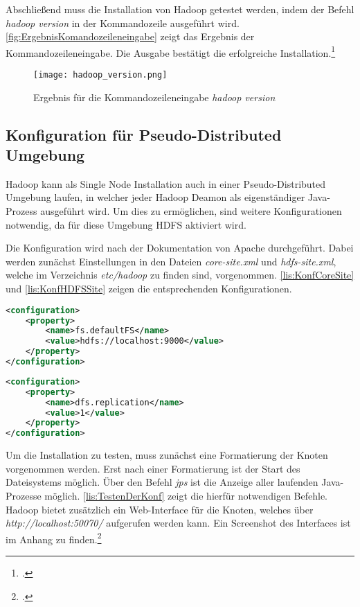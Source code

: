 Abschließend muss die Installation von Hadoop getestet werden, indem der Befehl \textit{hadoop version} in der Kommandozeile ausgeführt wird. \autoref{fig:ErgebnisKomandozeileneingabe} zeigt das Ergebnis der Kommandozeileneingabe. Die Ausgabe bestätigt die erfolgreiche Installation.\footcite[Vgl.][S. 32 f.]{Freiknecht.2014}

\begin{figure}[h]
	\texttt{[image: hadoop\_version.png]}
	\caption{Ergebnis für die Kommandozeileneingabe \textit{hadoop version}}
	\label{fig:ErgebnisKomandozeileneingabe}
\end{figure}

\subsection{Konfiguration für Pseudo-Distributed Umgebung}
Hadoop kann als Single Node Installation auch in einer Pseudo-Distributed Umgebung laufen, in welcher jeder Hadoop Deamon als eigenständiger Java-Prozess ausgeführt wird. Um dies zu ermöglichen, sind weitere Konfigurationen notwendig, da für diese Umgebung \ac{HDFS} aktiviert wird.

Die Konfiguration wird nach der Dokumentation von Apache durchgeführt. Dabei werden zunächst Einstellungen in den Dateien \textit{core-site.xml} und \textit{hdfs-site.xml}, welche im Verzeichnis \textit{etc/hadoop} zu finden sind, vorgenommen. \autoref{lis:KonfCoreSite} und \autoref{lis:KonfHDFSSite} zeigen die entsprechenden Konfigurationen. \\

\pagebreak
\begin{lstlisting}[language=XML, caption=Konfiguration in der core-site.xml, label=lis:KonfCoreSite]
<configuration>
	<property>
		<name>fs.defaultFS</name>
		<value>hdfs://localhost:9000</value>
	</property>
</configuration>
\end{lstlisting}

\begin{lstlisting}[language=XML, caption=Konfiguration in der hdfs-site.xml, label=lis:KonfHDFSSite]
<configuration>
	<property>
		<name>dfs.replication</name>
		<value>1</value>
	</property>
</configuration>
\end{lstlisting}

Um die Installation zu testen, muss zunächst eine Formatierung der Knoten vorgenommen werden. Erst nach einer Formatierung ist der Start des Dateisystems möglich. Über den Befehl \textit{jps} ist die Anzeige aller laufenden Java-Prozesse möglich. \autoref{lis:TestenDerKonf} zeigt die hierfür notwendigen Befehle. Hadoop bietet zusätzlich ein Web-Interface für die Knoten, welches über \textit{http://localhost:50070/} aufgerufen werden kann. Ein Screenshot des Interfaces ist im Anhang zu finden.\footcite[Vgl.][]{ApacheHadoopDoku.2015} \\

